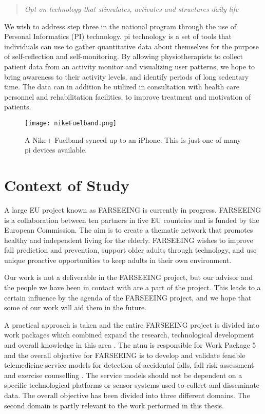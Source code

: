 \begin{quote}
\textit{Opt on technology that stimulates, activates and structures daily life}~\cite[page 120]{haagen}
\end{quote}

We wish to address step three in the national program through the use of Personal Informatics (PI) technology. \gls{pi} technology is a set of tools that individuals can use to gather quantitative data about themselves for the purpose of self-reflection and self-monitoring. By allowing physiotherapists to collect patient data from an activity monitor and visualizing user patterns, we hope to bring awareness to their activity levels, and identify periods of long sedentary time. The data can in addition be utilized in consultation with health care personnel and rehabilitation facilities, to improve treatment and motivation of patients.


\begin{figure}[h!]
	\centering
		\texttt{[image: nikeFuelband.png]}
		\caption[A Nike+ Fuelband synced up to an iPhone]{A Nike+ Fuelband synced up to an iPhone. This is just one of many \gls{pi} devices available.}
		\label{fig:nikeFuelbandPhone}
\end{figure}

\section{Context of Study}
A large EU project known as FARSEEING is currently in progress. FARSEEING is a collaboration between ten partners in five EU countries and is funded by the European Commission. The aim is to create a thematic network that promotes healthy and independent living for the elderly. FARSEEING wishes to improve fall prediction and prevention, support older adults through technology, and use unique proactive opportunities to keep adults in their own environment.

Our work is not a deliverable in the FARSEEING project, but our advisor and the people we have been in contact with are a part of the project. This leads to a certain influence by the agenda of the FARSEEING project, and we hope that some of our work will aid them in the future.

A practical approach is taken and the entire FARSEEING project is divided into work packages which combined expand the research, technological development and overall knowledge in this area \cite{farseeing}. The \gls{ntnu} is responsible for Work Package 5 and the overall objective for FARSEEING is to develop and validate feasible telemedicine service models for detection of accidental falls, fall risk assessment and exercise counselling \cite{wp5}. The service models should not be dependent on a specific technological platforms or sensor systems used to collect and disseminate data. The overall objective has been divided into three different domains. The second domain is partly relevant to the work performed in this thesis.

